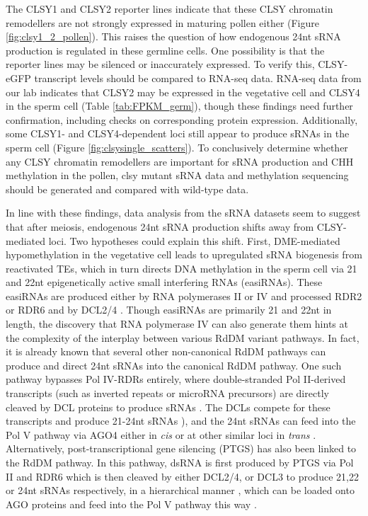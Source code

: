 The CLSY1 and CLSY2 reporter lines indicate that these CLSY chromatin remodellers are not strongly expressed in maturing pollen either (Figure \ref{fig:clsy1_2_pollen}). This raises the question of how endogenous 24nt sRNA production is regulated in these germline cells. One possibility is that the reporter lines may be silenced or inaccurately expressed. To verify this, CLSY-eGFP transcript levels should be compared to RNA-seq data. RNA-seq data from our lab indicates that CLSY2 may be expressed in the vegetative cell and CLSY4 in the sperm cell (Table \ref{tab:FPKM_germ}), though these findings need further confirmation, including checks on corresponding protein expression. Additionally, some CLSY1- and CLSY4-dependent loci still appear to produce sRNAs in the sperm cell (Figure \ref{fig:clsysingle_scatters}). To conclusively determine whether any CLSY chromatin remodellers are important for sRNA production and CHH methylation in the pollen, clsy mutant sRNA data and methylation sequencing should be generated and compared with wild-type data.

In line with these findings, data analysis from the sRNA datasets seem to suggest that after meiosis, endogenous 24nt sRNA production shifts away from CLSY-mediated loci. Two hypotheses could explain this shift. First, DME-mediated hypomethylation in the vegetative cell leads to upregulated sRNA biogenesis from reactivated TEs, which in turn directs DNA methylation in the sperm cell \cite{RN57,RN39} via 21 and 22nt epigenetically active small interfering RNAs (easiRNAs). These easiRNAs are produced either by RNA polymerases II or IV and processed RDR2 or RDR6 and by DCL2/4 \cite{RN75}. Though easiRNAs are primarily 21 and 22nt in length, the discovery that RNA polymerase IV can also generate them hints at the complexity of the interplay between various RdDM variant pathways. In fact, it is already known that several other non-canonical RdDM pathways can produce and direct 24nt sRNAs into the canonical RdDM pathway. One such pathway bypasses Pol IV-RDRs entirely, where double-stranded Pol II-derived transcripts (such as inverted repeats or microRNA precursors) are directly cleaved by DCL proteins to produce sRNAs \cite{RN269}. The DCLs compete for these transcripts and produce 21-24nt sRNAs \cite{RN268}), and the 24nt sRNAs can feed into the Pol V pathway via AGO4 either in \textit{cis} or at other similar loci in \textit{trans} \cite{RN270,RN269}. Alternatively, post-transcriptional gene silencing (PTGS) has also been linked to the RdDM pathway. In this pathway, dsRNA is first produced by PTGS via Pol II and RDR6 which is then cleaved by either DCL2/4, or DCL3 to produce 21,22 or 24nt sRNAs respectively, in a hierarchical manner \cite{RN267}, which can be loaded onto AGO proteins and feed into the Pol V pathway this way \cite{RN133}. 

